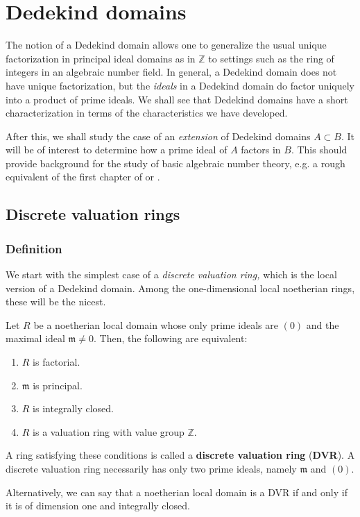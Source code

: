 \chapter{Dedekind domains}

The notion of a Dedekind domain allows one to generalize the usual unique
factorization in principal ideal domains as in $\mathbb{Z}$ to settings such
as the ring of integers in an algebraic number field. In general, a Dedekind
domain does not have unique factorization, but the \emph{ideals} in a Dedekind
domain do factor uniquely into a product of prime ideals. 
We shall see that Dedekind domains have a short characterization in terms of
the characteristics we have developed.

After this, we shall study the case of an \emph{extension} of Dedekind domains $A \subset B$. It will be of
interest to determine how a prime ideal of $A$ factors in $B$. This should
provide background for the study of basic algebraic number theory, e.g. a
rough equivalent of the first chapter of 
\cite{La94} or \cite{Se79}.




\section{Discrete valuation rings}


\subsection{Definition}

We start with the simplest case of a \emph{discrete valuation ring,} which is
the local version of a Dedekind domain.
Among the one-dimensional local noetherian rings, these will be the nicest.

\begin{theorem} \label{DVRthm}
Let $R$ be a noetherian local domain whose only prime ideals are $(0)$ and the maximal
ideal 
$\mathfrak{m} \neq 0$. 
Then, the following are equivalent:
\begin{enumerate}
\item $R$ is factorial.
\item $\mathfrak{m}$ is principal.
\item  $R$ is integrally closed.
\item $R$ is a valuation ring with value group $\mathbb{Z}$. 
\end{enumerate}
\end{theorem} 
\begin{definition} 
A ring satisfying these conditions is called a \textbf{discrete valuation
ring} (\textbf{DVR}).
A discrete valuation ring necessarily has only two prime ideals, namely
$\mathfrak{m}$ and $(0)$. 

Alternatively, we can say that a noetherian local domain is a DVR if and only
if it is of dimension one and integrally closed.
\end{definition} 



